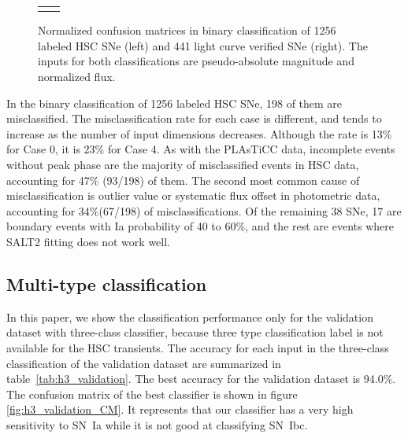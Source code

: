 \documentclass[useamsfonts]{pasj01}
\begin{document}
\begin{figure}[htbp]
\begin{tabular}{cc}
\begin{minipage}{0.5\hsize}
\begin{center}
            \end{center}
        \end{minipage}
    \end{tabular}
    \caption{%
  Normalized confusion matrices in binary classification of 1256 labeled HSC SNe (left) and 441 light curve verified SNe (right).
  The inputs for both classifications are pseudo-absolute magnitude and normalized flux.
}%
    \label{fig:h2_test_CM}
\end{figure}
%

In the binary classification of 1256 labeled HSC SNe, 198 of them are misclassified.
The misclassification rate for each case is different, and tends to increase as the number of input dimensions decreases.
Although the rate is 13\% for Case 0, it is 23\% for Case 4.
As with the PLAsTiCC data, incomplete events without peak phase are the majority of misclassified events in HSC data, accounting for 47\% (93/198) of them.
The second most common cause of misclassification is outlier value or systematic flux offset in photometric data, accounting for 34\%(67/198) of misclassifications.
Of the remaining 38 SNe, 17 are boundary events with Ia probability of 40 to 60\%, and the rest are events where SALT2 fitting does not work well.

%
%
\subsection{Multi-type classification}
\label{sec:h3}
%
In this paper, we show the classification performance only for the validation dataset with three-class classifier, because three type classification label is not available for the HSC transients.
%
The accuracy for each input in the three-class classification of the validation dataset are summarized in table\ \ref{tab:h3_validation}.
The best accuracy for the validation dataset is 94.0\%.
The confusion matrix of the best classifier is shown in figure \ref{fig:h3_validation_CM}.
It represents that our classifier has a very high sensitivity to SN~Ia while it is not good at classifying SN~Ibc.
\end{document}
